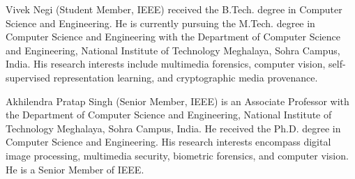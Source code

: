 \documentclass[journal]{IEEEtran}
\begin{document}



\begin{IEEEbiography}[{\fbox{\rule{0pt}{1.2in} \rule{1in}{0pt}}}]{Vivek Negi}
(Student Member, IEEE) received the B.Tech. degree in Computer Science and Engineering. He is currently pursuing the M.Tech. degree in Computer Science and Engineering with the Department of Computer Science and Engineering, National Institute of Technology Meghalaya, Sohra Campus, India. His research interests include multimedia forensics, computer vision, self-supervised representation learning, and cryptographic media provenance.
\end{IEEEbiography}

\begin{IEEEbiography}[{\fbox{\rule{0pt}{1.2in} \rule{1in}{0pt}}}]{Akhilendra Pratap Singh}
(Senior Member, IEEE) is an Associate Professor with the Department of Computer Science and Engineering, National Institute of Technology Meghalaya, Sohra Campus, India. He received the Ph.D. degree in Computer Science and Engineering. His research interests encompass digital image processing, multimedia security, biometric forensics, and computer vision. He is a Senior Member of IEEE.
\end{IEEEbiography}
\end{document}
